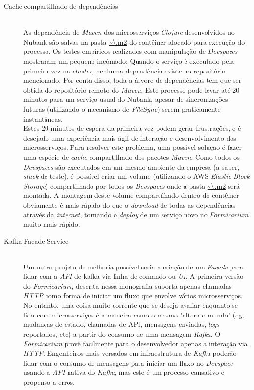 	\begin{description}
  \item[Cache compartilhado de dependências]
  \hfill \\As dependência de \textit{Maven} dos microsserviços \textit{Clojure} desenvolvidos no Nubank são salvas na pasta \url{~\.m2} do contêiner alocado para execução do processo. Os testes empíricos realizados com manipulação de \textit{Devspaces} mostraram um pequeno incômodo: Quando o serviço é executado pela primeira vez no \textit{cluster}, nenhuma dependência existe no repositório mencionado. Por conta disso, toda a árvore de dependências tem que ser obtida do repositório remoto do \textit{Maven}. Este processo pode levar até 20 minutos para um serviço usual do Nubank, apesar de sincronizações futuras (utilizando o mecanismo de \textit{FileSync}) serem praticamente instantâneas.\\
  Estes 20 minutos de espera da primeira vez podem gerar frustrações, e é desejado uma experiência mais ágil de interação e desenvolvimento dos microsserviços. Para resolver este problema, uma possível solução é fazer uma espécie de \textit{cache} compartilhado dos pacotes \textit{Maven}. Como todos os \textit{Devspaces} são executados em um mesmo ambiente da empresa (a saber, \textit{stack} de teste), é possível criar um volume (utilizando o AWS \textit{Elastic Block Storage}) compartilhado por todos os \textit{Devspaces} onde a pasta \url{~\.m2} será montada. A montagem deste volume compartilhado dentro do contêiner obviamente é mais rápido do que o \textit{download} de todas as dependências através da \textit{internet}, tornando o \textit{deploy} de um serviço novo no \textit{Formicarium} muito mais rápido.
  \item[Kafka Facade Service] %
  \hfill \\Um outro projeto de melhoria possível seria a criação de um \textit{Facade} para lidar com a \textit{API} de kafka via linha de comando ou \textit{UI}. A primeira versão do \textit{Formicarium}, descrita nessa monografia suporta apenas chamadas \textit{HTTP} como forma de iniciar um fluxo que envolve vários microsserviços. No entanto, uma coisa muito corrente que se deseja avaliar enquanto se lida com microsserviços é a maneira como o mesmo "altera o mundo" (eg, mudanças de estado, chamadas de API, mensagens enviadas, \textit{logs} reportados, etc) a partir do consumo de uma mensagem \textit{Kafka}. O \textit{Formicarium} provê facilmente para o desenvolvedor apenas a interação via \textit{HTTP}. Engenheiros mais versados em infraestrutura de \textit{Kafka} poderão lidar com o consumo de mensagens para iniciar um fluxo no \textit{Devspace} usando a \textit{API} nativa do \textit{Kafka}, mas este é um processo cansativo e propenso a erros.\\

\end{description}
